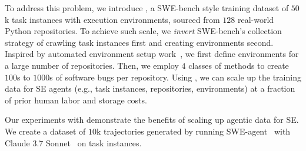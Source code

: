 To address this problem, we introduce \bugs{}, a SWE-bench style training dataset  of $50$k task instances with execution environments, sourced from $128$ real-world Python repositories. 
To achieve such scale, we \textit{invert} SWE-bench's collection strategy of crawling task instances first and creating environments second.
Inspired by automated environment setup work~\citep{bogin2024superevaluatingagentssetting}, we first define environments for a large number of repositories.
Then, we employ $4$ classes of methods to create $100$s to $1000$s of software bugs per repository.
Using \bugs{}, we can scale up the training data for SE agents (e.g., task instances, repositories, environments) at a fraction of prior human labor and storage costs.

Our experiments with \bugs{} demonstrate the benefits of scaling up agentic data for SE.
We create a dataset of $10$k trajectories generated by running SWE-agent~\citep{yang_swe-agent_2024} with Claude 3.7 Sonnet~\citep{anthropicclaude37} on \bugs{} task instances.
